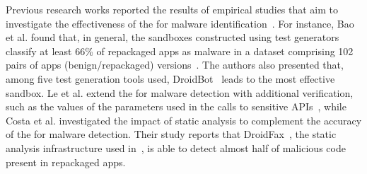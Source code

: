 






Previous research works reported the results of empirical studies that aim to investigate the effectiveness of
the \mas for malware identification~\cite{DBLP:conf/wcre/BaoLL18,DBLP:conf/scam/CostaMCMVBC20}.
For instance, Bao et al. found that, in general, the sandboxes constructed using test generators classify at least 66\% of repackaged apps as malware in a dataset comprising 102 pairs of apps (benign/repackaged) versions~\cite{DBLP:conf/wcre/BaoLL18}.
The authors also presented that, among five test generation tools used, DroidBot~\cite{DBLP:conf/icse/LiYGC17} leads to the most effective sandbox.
Le et al. extend the \mas for malware detection with additional verification,
such as the values of the parameters used in the
calls to sensitive APIs~\cite{le2018towards}, while
Costa et al.\cite{DBLP:journals/jss/CostaMMSSBNR22} investigated the impact of static analysis to complement the accuracy of the \mas
for malware detection. Their study reports that DroidFax~\cite{DBLP:conf/icsm/CaiR17a}, the static analysis infrastructure used in~\cite{DBLP:conf/wcre/BaoLL18}, is able to detect almost half of malicious code present in repackaged apps.



